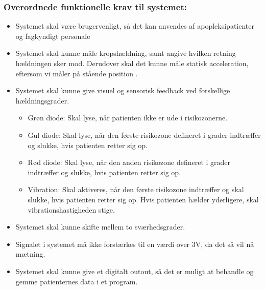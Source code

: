 
\subsubsection{Overordnede funktionelle krav til systemet:}
\begin{itemize}
\item Systemet skal være brugervenligt, så det kan anvendes af apopleksipatienter og fagkyndigt personale
\item Systemet skal kunne måle kropshældning, samt angive hvilken retning hældningen sker mod. Derudover skal det kunne måle statisk acceleration, eftersom vi måler på stående position .
\item Systemet skal kunne give visuel og sensorisk feedback ved forskellige hældningsgrader.
\begin{itemize}
\item Grøn diode: Skal lyse, når patienten ikke er ude i risikozonerne.  
\item Gul diode: Skal lyse, når den første risikozone defineret i grader indtræffer og slukke, hvis patienten retter sig op.
\item Rød diode: Skal lyse, når den anden risikozone defineret i grader indtræffer og slukke, hvis patienten retter sig op.
\item Vibration: Skal aktiveres, når den første risikozone indtræffer og skal slukke, hvis patienten retter sig op. Hvis patienten hælder yderligere, skal vibrationshastigheden stige.
\end{itemize}
\item Systemet skal kunne skifte mellem to sværhedsgrader.
\item Signalet i systemet må ikke forstærkes til en værdi over 3V, da det så vil nå mætning.
\item Systemet skal kunne give et digitalt outout, så det er muligt at behandle og gemme patienternes data i et program.
\end{itemize}



